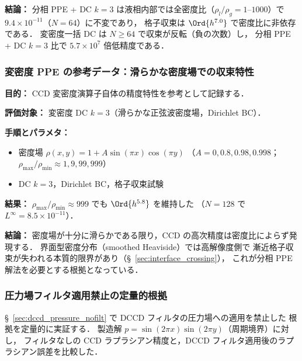 \noindent\textbf{結論：}
分相 PPE + DC $k{=}3$ は液相内部では全密度比（$\rho_l/\rho_g = 1$--$1000$）で
$9.4 \times 10^{-11}$（$N = 64$）に不変であり，
格子収束は $\Ord{h^{7.0}}$ で密度比に非依存である．
変密度一括 DC は $N \geq 64$ で収束が反転（負の次数）し，
分相 PPE + DC $k{=}3$ 比で $5.7 \times 10^7$ 倍低精度である．


\subsubsection{変密度 PPE の参考データ：滑らかな密度場での収束特性}
\label{sec:verify_ppe_varrho}
\label{sec:varrho_ppe_limitation}%

\noindent\textbf{目的：}
CCD 変密度演算子自体の精度特性を参考として記録する．

\noindent\textbf{評価対象：}
変密度 DC $k{=}3$（滑らかな正弦波密度場，Dirichlet BC）．

\noindent\textbf{手順とパラメタ：}
\begin{itemize}[noitemsep]
  \item 密度場 $\rho(x,y) = 1 + A\sin(\pi x)\cos(\pi y)$
        （$A = 0, 0.8, 0.98, 0.998$；$\rho_{\max}/\rho_{\min} \approx 1, 9, 99, 999$）
  \item DC $k{=}3$，Dirichlet BC，格子収束試験
\end{itemize}

\noindent\textbf{結果：}
$\rho_{\max}/\rho_{\min} \approx 999$ でも $\Ord{h^{5.8}}$ を維持した
（$N=128$ で $L^\infty = 8.5 \times 10^{-11}$）．

\noindent\textbf{結論：}
密度場が十分に滑らかである限り，CCD の高次精度は密度比によらず発現する．
界面型密度分布（smoothed Heaviside）では高解像度側で
漸近格子収束が失われる本質的限界があり（§~\ref{sec:interface_crossing}），
これが分相 PPE 解法を必要とする根拠となっている．

\subsubsection{圧力場フィルタ適用禁止の定量的根拠}
\label{sec:verify_pressure_filter}

§~\ref{sec:dccd_pressure_nofilt} で DCCD フィルタの圧力場への適用を禁止した
根拠を定量的に実証する．
製造解 $p = \sin(2\pi x)\sin(2\pi y)$（周期境界）に対し，
フィルタなしの CCD ラプラシアン精度と，DCCD フィルタ適用後のラプラシアン誤差を比較した．

